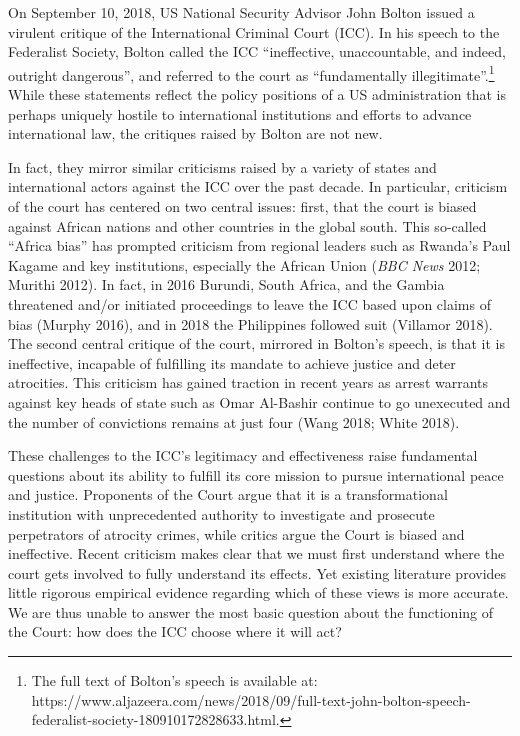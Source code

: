 On September 10, 2018, US National Security Advisor John Bolton issued a virulent critique of the International Criminal Court (ICC). In his speech to the Federalist Society, Bolton called the ICC ``ineffective, unaccountable, and indeed, outright dangerous'', and referred to the court as ``fundamentally illegitimate''.\footnote{The full text of Bolton's speech is available at: https://www.aljazeera.com/news/2018/09/full-text-john-bolton-speech-federalist-society-180910172828633.html.} While these statements reflect the policy positions of a US administration that is perhaps uniquely hostile to international institutions and efforts to advance international law, the critiques raised by Bolton are not new.

In fact, they mirror similar criticisms raised by a variety of states and international actors against the ICC over the past decade. In particular, criticism of the court has centered on two central issues: first, that the court is biased against African nations and other countries in the global south. This so-called ``Africa bias'' has prompted criticism from regional leaders such as Rwanda's Paul Kagame and key institutions, especially the African Union (\emph{BBC News} 2012; Murithi 2012). In fact, in 2016 Burundi, South Africa, and the Gambia threatened and/or initiated proceedings to leave the ICC based upon claims of bias (Murphy 2016), and in 2018 the Philippines followed suit (Villamor 2018). The second central critique of the court, mirrored in Bolton's speech, is that it is ineffective, incapable of fulfilling its mandate to achieve justice and deter atrocities. This criticism has gained traction in recent years as arrest warrants against key heads of state such as Omar Al-Bashir continue to go unexecuted and the number of convictions remains at just four (Wang 2018; White 2018).

These challenges to the ICC's legitimacy and effectiveness raise fundamental questions about its ability to fulfill its core mission to pursue international peace and justice. Proponents of the Court argue that it is a transformational institution with unprecedented authority to investigate and prosecute perpetrators of atrocity crimes, while critics argue the Court is biased and ineffective. Recent criticism makes clear that we must first understand where the court gets involved to fully understand its effects. %
Yet existing literature provides little rigorous empirical evidence regarding which of these views is more accurate. We are thus unable to answer the most basic question about the functioning of the Court: how does the ICC choose where it will act?


